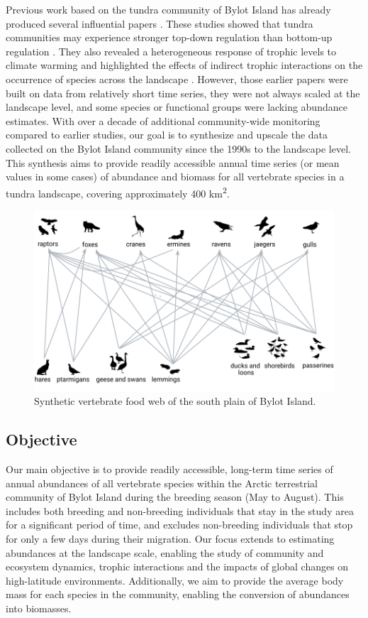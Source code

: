 \documentclass[a4paper,twoside,12pt]{article}
\begin{document}
Previous work based on the tundra community of Bylot Island  has already produced several influential papers \citep{gauthier2011, legagneux2012, legagneux2014,hutchison2020, duchesne2021, gauthier2024b}. These studies showed that tundra communities may experience stronger top-down regulation than bottom-up regulation \citep{legagneux2012, legagneux2014}. They also revealed a heterogeneous response of trophic levels to climate warming \citep{gauthier2013} and highlighted the effects of indirect trophic interactions on the occurrence of species across the landscape \citep{duchesne2021}. However, those earlier papers were built on data from relatively short time series, they were not always scaled at the landscape level, and some species or functional groups were lacking abundance estimates. With over a decade of additional community-wide monitoring compared to earlier studies, our goal is to synthesize and upscale the data collected on the Bylot Island community since the 1990s to the landscape level. This synthesis aims to provide readily accessible annual time series (or mean values in some cases) of abundance and biomass for all vertebrate species in a tundra landscape, covering approximately 400 km\textsuperscript{2}. 

\begin{figure}[H]
\centering
\includegraphics[width=0.75\linewidth]{figures/food_web.pdf} 
\caption{Synthetic vertebrate food web of the south plain of Bylot Island.}
\label{figure:food_web}
\end{figure}

\subsection*{Objective}
Our main objective is to provide readily accessible, long-term time series of annual abundances of all vertebrate species within the Arctic terrestrial community of Bylot Island during the breeding season (May to August). This includes both breeding and non-breeding individuals that stay in the study area for a significant period of time, and excludes non-breeding individuals that stop for only a few days during their migration. Our focus extends to estimating abundances at the landscape scale, enabling the study of community and ecosystem dynamics, trophic interactions and the impacts of global changes on high-latitude environments. Additionally, we aim to provide the average body mass for each species in the community, enabling the conversion of abundances into biomasses.
\newpage
\end{document}
